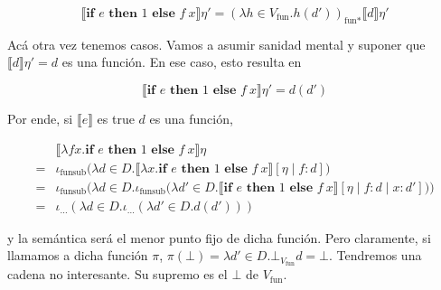 \documentclass[article, 12pt]{article}
\begin{document}
\begin{equation*}
    \llbracket \textbf{if } e \textbf{ then } 1 \textbf{ else } f ~
    x\rrbracket\eta' = (\lambda h \in
    V_{\text{fun}}.h(d'))_{\text{fun}*}\llbracket d \rrbracket\eta'
\end{equation*}

Acá otra vez tenemos casos. Vamos a asumir sanidad mental y suponer que
$\llbracket d \rrbracket\eta' = d$ es una función. En ese caso, esto resulta en 

\begin{equation*}
    \llbracket \textbf{if } e \textbf{ then } 1 \textbf{ else } f ~
    x\rrbracket\eta' =d(d')
\end{equation*}

Por ende, si $\llbracket e \rrbracket$ es true $d$ es una función, 

\begin{align*}
    &\llbracket \lambda fx.\textbf{if } e \textbf{ then } 1 \textbf{ else } f
    ~  x \rrbracket\eta \\
    =&\iota_{\text{funsub}} \Big( \lambda d \in D. \llbracket \lambda x.
    \textbf{if } e \textbf{ then } 1 \textbf{ else } f ~  x\rrbracket[\eta \mid
f : d] \Big) \\ 
=&\iota_{\text{funsub}} \Big(  \lambda d \in D. \iota_{\text{funsub}}\Big( \lambda d' \in D.
     \llbracket \textbf{if } e \textbf{ then } 1 \textbf{ else } f ~
x\rrbracket[\eta \mid f : d \mid x : d'] \Big) \Big)  \\ 
        =&\iota_{\ldots}(\lambda d \in D. \iota_{\ldots} (\lambda d' \in D. d(d')))
\end{align*}

y la semántica será el menor punto fijo de dicha función. Pero claramente, si
llamamos a dicha función $\pi$, $\pi(\bot ) = \lambda d' \in
D.\bot_{V_{\text{fun}}} d = \bot $. Tendremos una cadena no interesante. Su
supremo es el $\bot$ de $V_{\text{fun}}$.
\end{document}
